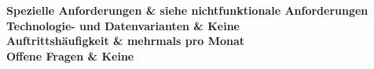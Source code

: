 \begin{longtabu}
	\bfseries Spezielle Anforderungen & siehe nichtfunktionale Anforderungen  \\\hline 
	\bfseries Technologie- und Datenvarianten & Keine  \\\hline 
	\bfseries Auftrittshäufigkeit & mehrmals pro Monat  \\\hline 
	\bfseries Offene Fragen & Keine  \\\hline  
\end{longtabu}
